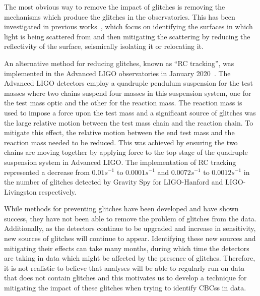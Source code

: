 The most obvious way to remove the impact of glitches is removing the mechanisms which produce the glitches in the observatories. This has been investigated in previous works~\cite{reducing_scattering:2020, TAccadia:2010, Nuttall:2018, gwadaptive:2022, HilbertHuang:2017, tvf-EMD:2020, Scattering_Monitoring:2022, Was_Subtract:2021}, which focus on identifying the surfaces in which light is being scattered from and then mitigating the scattering by reducing the reflectivity of the surface, seismically isolating it or relocating it. 

An alternative method for reducing \scl{} glitches, known as ``RC tracking'', was implemented in the Advanced LIGO observatories in January 2020~\cite{reducing_scattering:2020}. The Advanced LIGO detectors employ a quadruple pendulum suspension for the test masses where two chains suspend four masses in this suspension system, one for the test mass optic and the other for the reaction mass. The reaction mass is used to impose a force upon the test mass and a significant source of \scl{} glitches was the large relative motion between the test mass chain and the reaction chain. To mitigate this effect, the relative motion between the end test mass and the reaction mass needed to be reduced. This was achieved by ensuring the two chains are moving together by applying force to the top stage of the quadruple suspension system in Advanced LIGO. The implementation of RC tracking represented a decrease from $0.01 s^{-1}$ to $0.0001 s^{-1}$ and $0.0072 s^{-1}$ to $0.0012 s^{-1}$ in the number of \scl{} glitches detected by Gravity Spy for LIGO-Hanford and LIGO-Livingston respectively.

While methods for preventing \scl{} glitches have been developed and have shown success, they have not been able to remove the problem of \scl{} glitches from the data. Additionally, as the detectors continue to be upgraded and increase in sensitivity, new sources of \scl{} glitches will continue to appear. Identifying these new sources and mitigating their effects can take many months, during which time the detectors are taking in data which might be affected by the presence of \scl{} glitches. Therefore, it is not realistic to believe that analyses will be able to regularly run on data that does not contain \scl{} glitches and this motivates us to develop a technique for mitigating the impact of these glitches when trying to identify CBCss in \gw{} data.

